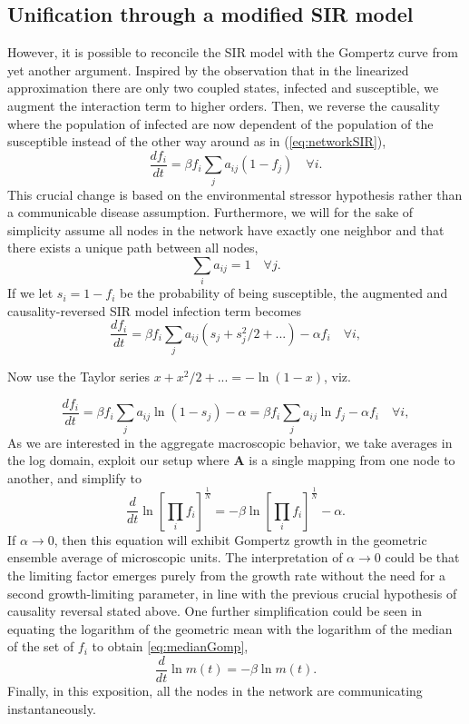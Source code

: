 \documentclass{article}
\begin{document}
\subsection{Unification through a modified SIR model}
However, it is possible to reconcile the SIR model with the Gompertz curve from yet another argument. 
Inspired by the observation that in the linearized approximation there are only two coupled states, infected and susceptible, we augment the interaction term to higher orders. 
Then, we reverse the causality where the population of infected are now dependent of the population of the susceptible instead of the other way around as in (\ref{eq:networkSIR}),
\begin{equation}
\label{eq:reverseNetworkSIR}
\frac{d f_i}{dt} = \beta f_i\sum_j{a_{ij}}(1-f_j) \quad \forall i.
\end{equation} 
This crucial change is based on the environmental stressor hypothesis rather than a communicable disease assumption.
Furthermore, we will for the sake of simplicity assume all nodes in the network have exactly one neighbor and that there exists a unique path between all nodes,
\begin{equation}
\sum_i a_{ij} = 1 \quad \forall j.
\end{equation} 
If we let $s_i = 1 - f_i$ be the probability of being susceptible, the augmented and causality-reversed SIR model infection term becomes 
\begin{equation}
\frac{d f_i}{dt} = \beta f_i\sum_j{a_{ij}}(s_{j} + s^2_j/2 + ...) - \alpha f_i\quad \forall i,
\end{equation}

Now use the Taylor series $x+x^2/2+... = -\ln(1-x)$, viz.

\begin{equation}
\frac{d f_i}{dt} = \beta f_i\sum_j{a_{ij}}\ln{(1 - s_{j})} - \alpha = \beta f_i\sum_j{a_{ij}}\ln{f_{j}} - \alpha f_i \quad \forall i,
\end{equation}
As we are interested in the aggregate macroscopic behavior, we take averages in the log domain, exploit our setup where $\mathbf{A}$ is a single mapping from one node to another, and simplify to
\begin{equation}
\frac{d}{{dt}} \ln\left[\prod_i{f_i}\right]^{\frac{1}{N}} = -\beta\ln\left[\prod_i{f_i}\right]^{\frac{1}{N}} - \alpha.
\end{equation}
If $\alpha\rightarrow 0$, then this equation will exhibit Gompertz growth in the geometric ensemble average of microscopic units. The interpretation of $\alpha\rightarrow 0$ could be that the limiting factor emerges purely from the growth rate without the need for a second growth-limiting parameter, in line with the previous crucial hypothesis of causality reversal stated above. One further simplification could be seen in equating the logarithm of the geometric mean with the logarithm of the median of the set of $f_i$ to obtain \ref{eq:medianGomp},
\begin{equation}
\frac{d}{dt}\ln{m(t)} = -\beta \ln{m(t)}.
\end{equation}
Finally, in this exposition, all the nodes in the network are communicating instantaneously. 
\end{document}
